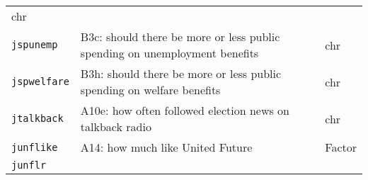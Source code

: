\documentclass[]{article}
\begin{document}
\begin{longtable}[]{@{}lll@{}}
\begin{minipage}[t]{0.08\columnwidth}
chr\strut
\end{minipage}\tabularnewline
\begin{minipage}[t]{0.14\columnwidth}\raggedright\strut
\texttt{jspunemp}\strut
\end{minipage} & \begin{minipage}[t]{0.70\columnwidth}\raggedright\strut
B3c: should there be more or less public spending on unemployment
benefits\strut
\end{minipage} & \begin{minipage}[t]{0.08\columnwidth}\raggedright\strut
chr\strut
\end{minipage}\tabularnewline
\begin{minipage}[t]{0.14\columnwidth}\raggedright\strut
\texttt{jspwelfare}\strut
\end{minipage} & \begin{minipage}[t]{0.70\columnwidth}\raggedright\strut
B3h: should there be more or less public spending on welfare
benefits\strut
\end{minipage} & \begin{minipage}[t]{0.08\columnwidth}\raggedright\strut
chr\strut
\end{minipage}\tabularnewline
\begin{minipage}[t]{0.14\columnwidth}\raggedright\strut
\texttt{jtalkback}\strut
\end{minipage} & \begin{minipage}[t]{0.70\columnwidth}\raggedright\strut
A10e: how often followed election news on talkback radio\strut
\end{minipage} & \begin{minipage}[t]{0.08\columnwidth}\raggedright\strut
chr\strut
\end{minipage}\tabularnewline
\begin{minipage}[t]{0.14\columnwidth}\raggedright\strut
\texttt{junflike}\strut
\end{minipage} & \begin{minipage}[t]{0.70\columnwidth}\raggedright\strut
A14: how much like United Future\strut
\end{minipage} & \begin{minipage}[t]{0.08\columnwidth}\raggedright\strut
Factor\strut
\end{minipage}\tabularnewline
\begin{minipage}[t]{0.14\columnwidth}\raggedright\strut
\texttt{junflr}\strut
\end{minipage} & \begin{minipage}[t]{0.70\columnwidth}\raggedright\strut

\end{minipage}
\end{longtable}
\end{document}
